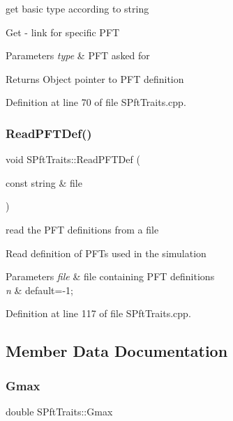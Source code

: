 get basic type according to string 

Get -\/ link for specific P\+FT 
\begin{DoxyParams}{Parameters}
{\em type} & P\+FT asked for \\
\hline
\end{DoxyParams}
\begin{DoxyReturn}{Returns}
Object pointer to P\+FT definition 
\end{DoxyReturn}


Definition at line 70 of file S\+Pft\+Traits.\+cpp.

\mbox{\label{class_s_pft_traits_ac79f86169db7e8dc48cd7d3ac8890a63}} 
\subsubsection{\texorpdfstring{ReadPFTDef()}{ReadPFTDef()}}
{\footnotesize\ttfamily void S\+Pft\+Traits\+::\+Read\+P\+F\+T\+Def (\begin{DoxyParamCaption}\item[{const string \&}]{file }\end{DoxyParamCaption})\hspace{0.3cm}{\ttfamily [static]}}



read the P\+FT definitions from a file 

Read definition of P\+F\+Ts used in the simulation 
\begin{DoxyParams}{Parameters}
{\em file} & file containing P\+FT definitions \\
\hline
{\em n} & default=-\/1; \\
\hline
\end{DoxyParams}


Definition at line 117 of file S\+Pft\+Traits.\+cpp.



\subsection{Member Data Documentation}
\mbox{\label{class_s_pft_traits_a2696ba31c6746b189f57c218b06e5549}} 
\subsubsection{\texorpdfstring{Gmax}{Gmax}}
{\footnotesize\ttfamily double S\+Pft\+Traits\+::\+Gmax}



